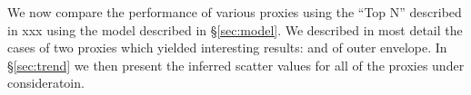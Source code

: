 \documentclass[a4paper,fleqn,usenatbib]{mnras}
\begin{document}
We now compare the performance of various proxies using the  ``Top N'' described in xxx using the model described in  \S \ref{sec:model}. We described in most detail the cases of two proxies which yielded interesting results: \mcmodel{} and \mstar{} of outer envelope. In \S \ref{sec:trend} we then present the inferred scatter values for all of the proxies under consideratoin. 



\end{document}
